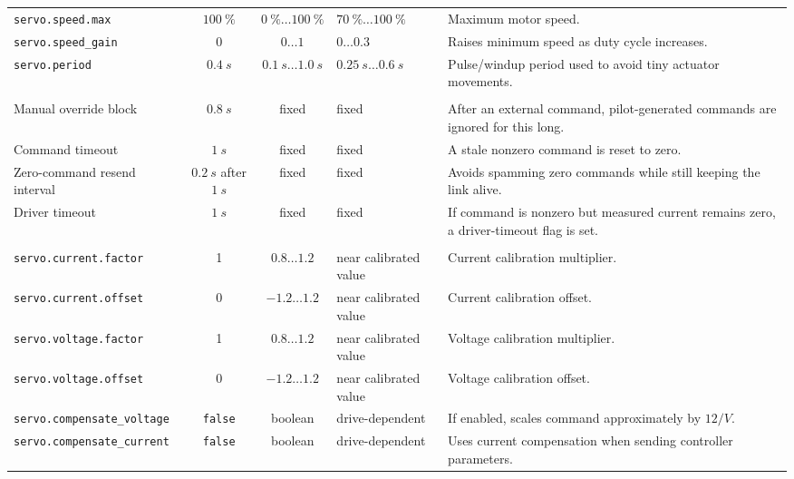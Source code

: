 \documentclass[10pt,twocolumn]{article}
\begin{document}
\begin{table}[!tbp]
\begin{tabularx}{\textwidth}{Z{0.23\textwidth}c c Z{0.16\textwidth}Y}
\texttt{servo.speed.max} & \(\SI{100}{\percent}\) & \(\SI{0}{\percent}\ldots\SI{100}{\percent}\) & \(\SI{70}{\percent}\ldots\SI{100}{\percent}\) & Maximum motor speed. \\
\texttt{servo.speed\_gain} & \num{0} & \(\num{0}\ldots\num{1}\) & \(\num{0}\ldots\num{0.3}\) & Raises minimum speed as duty cycle increases. \\
\texttt{servo.period} & \(\SI{0.4}{s}\) & \(\SI{0.1}{s}\ldots\SI{1.0}{s}\) & \(\SI{0.25}{s}\ldots\SI{0.6}{s}\) & Pulse/windup period used to avoid tiny actuator movements. \\
\addlinespace[0.6ex]
 \\
\addlinespace[0.25ex]
Manual override block & \(\SI{0.8}{s}\) & fixed & fixed & After an external command, pilot-generated commands are ignored for this long. \\
Command timeout & \(\SI{1}{s}\) & fixed & fixed & A stale nonzero command is reset to zero. \\
Zero-command resend interval & \(\SI{0.2}{s}\) after \(\SI{1}{s}\) & fixed & fixed & Avoids spamming zero commands while still keeping the link alive. \\
Driver timeout & \(\SI{1}{s}\) & fixed & fixed & If command is nonzero but measured current remains zero, a driver-timeout flag is set. \\
\addlinespace[0.6ex]
 \\
\addlinespace[0.25ex]
\texttt{servo.current.factor} & \num{1} & \(\num{0.8}\ldots\num{1.2}\) & near calibrated value & Current calibration multiplier. \\
\texttt{servo.current.offset} & \num{0} & \(\num{-1.2}\ldots\num{1.2}\) & near calibrated value & Current calibration offset. \\
\texttt{servo.voltage.factor} & \num{1} & \(\num{0.8}\ldots\num{1.2}\) & near calibrated value & Voltage calibration multiplier. \\
\texttt{servo.voltage.offset} & \num{0} & \(\num{-1.2}\ldots\num{1.2}\) & near calibrated value & Voltage calibration offset. \\
\texttt{servo.compensate\_voltage} & \texttt{false} & boolean & drive-dependent & If enabled, scales command approximately by \(12/V\). \\
\texttt{servo.compensate\_current} & \texttt{false} & boolean & drive-dependent & Uses current compensation when sending controller parameters. \\

\end{tabularx}
\end{table}
\end{document}
